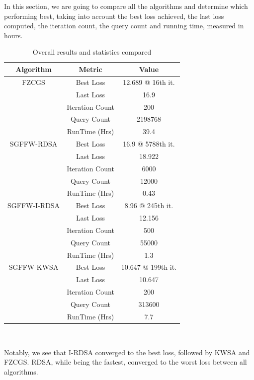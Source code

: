 \documentclass[10pt,twocolumn,letterpaper]{article}
\begin{document}
In this section, we are going to compare all the algorithms and determine which performing best,
taking into account the best loss achieved, the last loss computed, 
the iteration count, the query count and running time, measured in hours.

\begin{table}[h]
   \centering
   \begin{tabular}{ccc}
       \hline
       Algorithm & Metric & Value \\
       \hline
       FZCGS & Best Loss & 12.689 @ 16th it.\\
            & Last Loss & 16.9\\
            & Iteration Count & 200\\
            & Query Count & 2198768\\
            & RunTime (Hrs) & 39.4\\
       \hline
       SGFFW-RDSA & Best Loss & 16.9 @ 5788th it.\\
                  & Last Loss & 18.922\\
                  & Iteration Count & 6000\\
                  & Query Count & 12000\\
                  & RunTime (Hrs) & 0.43\\
       \hline
       SGFFW-I-RDSA & Best Loss & 8.96 @ 245th it.\\
                    & Last Loss & 12.156\\
                    & Iteration Count & 500\\
                    & Query Count & 55000\\
                    & RunTime (Hrs) & 1.3\\
       \hline
       SGFFW-KWSA & Best Loss & 10.647 @ 199th it.\\
                  & Last Loss & 10.647\\
                  & Iteration Count & 200\\
                  & Query Count & 313600\\
                  & RunTime (Hrs) & 7.7\\
       \hline
   \end{tabular}
   \
   \caption{Overall results and statistics compared} 
   \label{tab:overall_results}
\end{table}

Notably, we see that I-RDSA converged to the best loss, followed by KWSA and FZCGS.
RDSA, while being the fastest, converged to the worst loss between all algorithms.
\end{document}
